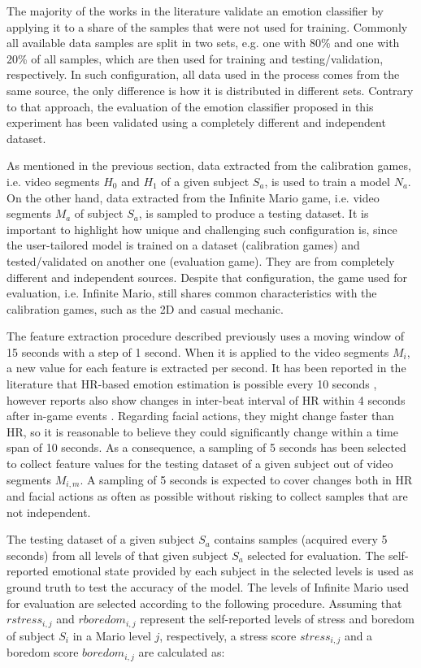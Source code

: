 The majority of the works in the literature validate an emotion classifier by applying it to a share of the samples that were not used for training. Commonly all available data samples are split in two sets, e.g. one with 80\% and one with 20\% of all samples, which are then used for training and testing/validation, respectively. In such configuration, all data used in the process comes from the same source, the only difference is how it is distributed in different sets. Contrary to that approach, the evaluation of the emotion classifier proposed in this experiment has been validated using a completely different and independent dataset.

As mentioned in the previous section, data extracted from the calibration games, i.e. video segments $H_0$ and $H_1$ of a given subject $S_a$, is used to train a model $N_a$. On the other hand, data extracted from the Infinite Mario game, i.e. video segments $M_a$ of subject $S_a$, is sampled to produce a testing dataset. It is important to highlight how unique and challenging such configuration is, since the user-tailored model is trained on a dataset (calibration games) and tested/validated on another one (evaluation game). They are from completely different and independent sources. Despite that configuration, the game used for evaluation, i.e. Infinite Mario, still shares common characteristics with the calibration games, such as the 2D and casual mechanic.

The feature extraction procedure described previously uses a moving window of 15 seconds with a step of 1 second. When it is applied to the video segments $M_i$, a new value for each feature is extracted per second. It has been reported in the literature that HR-based emotion estimation is possible every 10 seconds \parencite{valenza2014revealing}, however reports also show changes in inter-beat interval of HR within 4 seconds after in-game events \parencite{ravaja20051}. Regarding facial actions, they might change faster than HR, so it is reasonable to believe they could significantly change within a time span of 10 seconds. As a consequence, a sampling of 5 seconds has been selected to collect feature values for the testing dataset of a given subject out of video segments $M_{i,m}$. A sampling of 5 seconds is expected to cover changes both in HR and facial actions as often as possible without risking to collect samples that are not independent.

The testing dataset of a given subject $S_a$ contains samples (acquired every 5 seconds) from all levels of that given subject $S_a$ selected for evaluation. The self-reported emotional state provided by each subject in the selected levels is used as ground truth to test the accuracy of the model. The levels of Infinite Mario used for evaluation are selected according to the following procedure. Assuming that $rstress_{i,j}$ and $rboredom_{i,j}$ represent the self-reported levels of stress and boredom of subject $S_i$ in a Mario level $j$, respectively, a stress score $stress_{i,j}$ and a boredom score $boredom_{i,j}$ are calculated as:

